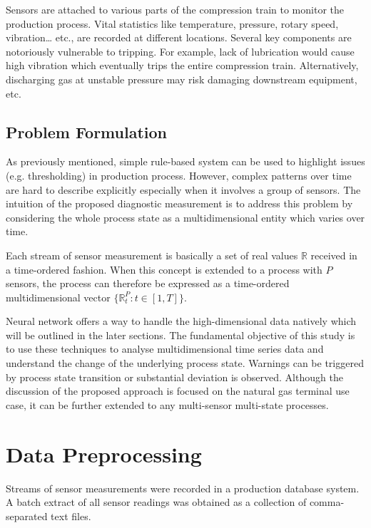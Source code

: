\documentclass[11pt]{article} %
\theoremstyle{plain}
\theoremstyle{definition}
\begin{document}
Sensors are attached to various parts of the compression train to monitor the production process. Vital statistics like temperature, pressure, rotary speed, vibration… etc., are recorded at different locations. Several key components are notoriously vulnerable to tripping. For example, lack of lubrication would cause high vibration which eventually trips the entire compression train. Alternatively, discharging gas at unstable pressure may risk damaging downstream equipment, etc.

\subsection{Problem Formulation}

As previously mentioned, simple rule-based system can be used to highlight issues (e.g. thresholding) in production process. However, complex patterns over time are hard to describe explicitly especially when it involves a group of sensors. The intuition of the proposed diagnostic measurement is to address this problem by considering the whole process state as a multidimensional entity which varies over time.

Each stream of sensor measurement is basically a set of real values \(\mathbb{R}\) received in a time-ordered fashion. When this concept is extended to a process with \(P\) sensors, the process can therefore be expressed as a time-ordered multidimensional vector \( \{ \mathbb{R}_t^P:t\in [1,T] \} \).

Neural network offers a way to handle the high-dimensional data natively which will be outlined in the later sections. The fundamental objective of this study is to use these techniques to analyse multidimensional time series data and understand the change of the underlying process state. Warnings can be triggered by process state transition or substantial deviation is observed. Although the discussion of the proposed approach is focused on the natural gas terminal use case, it can be further extended to any multi-sensor multi-state processes.

\newpage
\section{Data Preprocessing}

Streams of sensor measurements were recorded in a production database system. A batch extract of all sensor readings was obtained as a collection of comma-separated text files.
\end{document}
